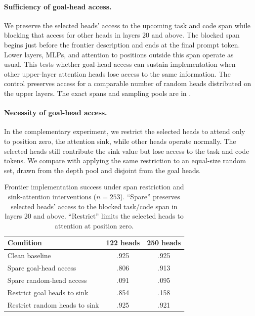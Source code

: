 \paragraph{Sufficiency of goal-head access.}
We preserve the selected heads' access to the upcoming task and code span while blocking that access for other heads in layers 20 and above. The blocked span begins just before the frontier description and ends at the final prompt token. Lower layers, MLPs, and attention to positions outside this span operate as usual. This tests whether goal-head access can sustain implementation when other upper-layer attention heads lose access to the same information. The control preserves access for a comparable number of random heads distributed on the upper layers. The exact spans and sampling pools are in .

\paragraph{Necessity of goal-head access.}
\label{sec:mechanism:necessity}
In the complementary experiment, we restrict the selected heads to attend only to position zero, the attention sink, while other heads operate normally. The selected heads still contribute the sink value but lose access to the task and code tokens. We compare with applying the same restriction to an equal-size random set, drawn from the depth pool and disjoint from the goal heads.

\begin{table}[t]
\centering\small
\begin{tabular}{lcc}
\toprule
Condition & 122 heads & 250 heads\\
\midrule
Clean baseline & .925 & .925\\
Spare goal-head access & .806 & .913\\
Spare random-head access & .091 & .095\\
\midrule
Restrict goal heads to sink & .854 & .158\\
Restrict random heads to sink & .925 & .921\\
\bottomrule
\end{tabular}
\caption{Frontier implementation success under span restriction and sink-attention interventions ($n=253$). ``Spare'' preserves selected heads' access to the blocked task/code span in layers 20 and above. ``Restrict'' limits the selected heads to attention at position zero.}
\label{tab:goal-ablation}
\end{table}

